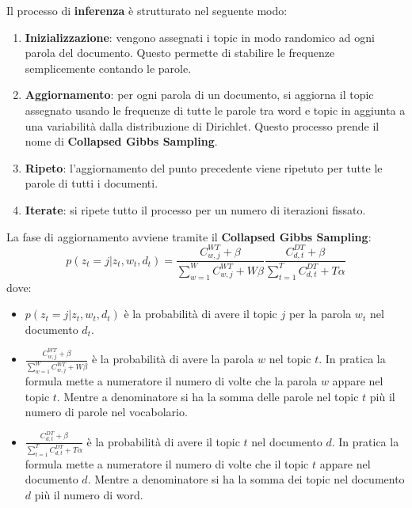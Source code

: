Il processo di \textbf{inferenza} è strutturato nel seguente modo:
\begin{enumerate}
      \item \textbf{Inizializzazione}: vengono assegnati i topic in modo randomico
            ad ogni parola del documento. Questo permette di stabilire le
            frequenze semplicemente contando le parole.
      \item \textbf{Aggiornamento}: per ogni parola di un documento, si aggiorna
            il topic assegnato usando le frequenze di tutte le parole tra word e
            topic in aggiunta a una variabilità dalla distribuzione di Dirichlet.
            Questo processo prende il nome di \textbf{Collapsed Gibbs Sampling}.
      \item \textbf{Ripeto}: l'aggiornamento del punto precedente viene ripetuto
            per tutte le parole di tutti i documenti.
      \item \textbf{Iterate}: si ripete tutto il processo per un numero di iterazioni
            fissato.
\end{enumerate}

La fase di aggiornamento avviene tramite il \textbf{Collapsed Gibbs Sampling}:
\begin{equation}
      p(z_t = j | z_t, w_t,d_t) = \frac{C_{w, j}^{WT} + \beta}{\sum_{w = 1}^{W} C_{w, j}^{WT} + W\beta}
      \frac{C_{d, t}^{DT} + \beta}{\sum_{t = 1}^{T} C_{d, t}^{DT} + T\alpha}
\end{equation}
dove:
\begin{itemize}
      \item $p(z_t = j | z_t, w_t,d_t)$ è la probabilità di avere il topic $j$
            per la parola $w_t$ nel documento $d_t$.
      \item $\frac{C_{w, j}^{WT} + \beta}{\sum_{w = 1}^{W} C_{w, j}^{WT} + W\beta}$
            è la probabilità di avere la parola $w$ nel topic $t$. In pratica la
            formula mette a numeratore il numero di volte che la parola $w$ appare
            nel topic $t$. Mentre a denominatore si ha la somma delle parole nel
            topic $t$ più il numero di parole nel vocabolario.
      \item $\frac{C_{d, t}^{DT} + \beta}{\sum_{t = 1}^{T} C_{d, t}^{DT} + T\alpha}$
            è la probabilità di avere il topic $t$ nel documento $d$. In pratica
            la formula mette a numeratore il numero di volte che il topic $t$ appare
            nel documento $d$. Mentre a denominatore si ha la somma dei topic
            nel documento $d$ più il numero di word.
\end{itemize}
